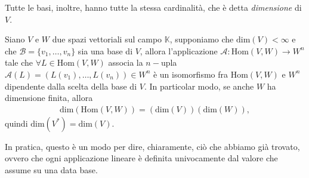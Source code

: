 Tutte le basi, inoltre, hanno tutte la stessa cardinalità, che è detta \emph{dimensione} di $V$.
\begin{prop}
    Siano $V$ e $W$ due spazi vettoriali sul campo $\mathbb{K}$, supponiamo che $\text{dim}(V) < \infty$ e che $\mathcal{B} = \{ v_1, \ldots, v_n \}$ sia una base di $V$, allora l'applicazione $\mathcal{A} : \text{Hom}(V, W) \to W^n$ tale che $\forall L \in \text{Hom}(V, W)$ associa la $n-$upla $\mathcal{A}(L) = (L(v_1), \ldots, L(v_n)) \in W^n$ è un isomorfismo fra $\text{Hom}(V, W)$ e $W^n$ dipendente dalla scelta della base di $V$. In particolar modo, se anche $W$ ha dimensione finita, allora
    \begin{align}
        \text{dim}(\text{Hom}(V, W)) = (\text{dim}(V))(\text{dim}(W)),
    \end{align}
    quindi $\text{dim}(V^*) = \text{dim}(V)$.
\end{prop}
In pratica, questo è un modo per dire, chiaramente, ciò che abbiamo già trovato, ovvero che ogni applicazione lineare è definita univocamente dal valore che assume su una data base.

